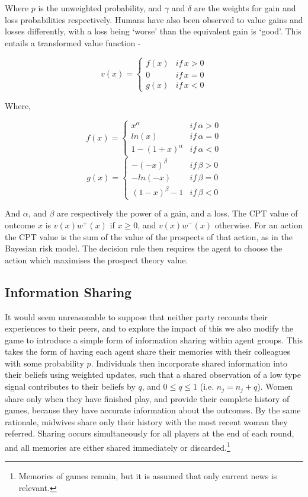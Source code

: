Where $p$ is the unweighted probability, and $\gamma$ and $\delta$
are the weights for gain and loss probabilities respectively. Humans
have also been observed to value gains and losses differently, with
a loss being `worse' than the equivalent gain is `good'. This
entails a transformed value function -

\[
v(x)=\begin{cases}
f(x) & if\, x>0\\
0 & if\, x=0\\
g(x) & if\, x<0
\end{cases}
\]


Where,

\[
f(x)=\begin{cases}
x^{\alpha} & if\,\alpha>0\\
ln(x) & if\,\alpha=0\\
1-(1+x)^{\alpha} & if\,\alpha<0
\end{cases}
\]
\[
g(x)=\begin{cases}
-(-x)^{\beta} & if\,\beta>0\\
-ln(-x) & if\,\beta=0\\
(1-x)^{\beta}-1 & if\,\beta<0
\end{cases}
\]


And $\alpha$, and $\beta$ are respectively the power of a gain,
and a loss. The \ac{CPT} value of outcome $x$ is $v(x)w^{+}(x)$
if $x\geq0$, and $v(x)w^{-}(x)$ otherwise. For an action the \ac{CPT}
value is the sum of the value of the prospects of that action, as
in the Bayesian risk model. The decision rule then requires the agent
to choose the action which maximises the prospect theory value.

\subsection{Information Sharing}
\label{sub:info_sharing}

It would seem unreasonable to suppose that neither party recounts their experiences to their peers, and to explore the impact of this we also modify the game to introduce a simple form of information sharing within agent groups. This takes the form of having each agent share their memories with their colleagues with some probability \(p\). Individuals then incorporate shared information into their beliefs using weighted updates, such that a shared observation of a low type signal contributes to their beliefs by \(q\), and \(0\leq q\leq 1\) (i.e. \(n_{j} = n_{j} + q\)).
Women share only when they have finished play, and provide their complete history of games, because they have accurate information about the outcomes. By the same rationale, midwives share only their history with the most recent woman they referred. Sharing occurs simultaneously for all players at the end of each round, and all memories are either shared immediately or discarded.\footnote{Memories of games remain, but it is assumed that only current news is relevant.}

